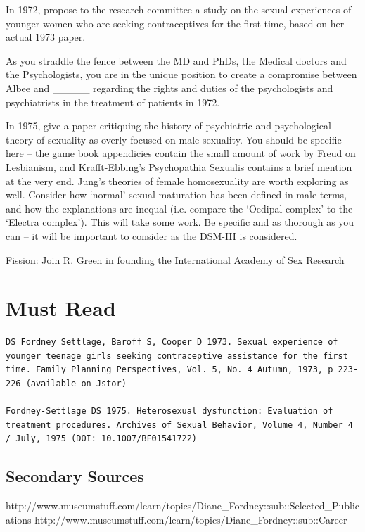 \begin{refsection}
In 1972, propose to the research committee a study on the sexual experiences of younger women who are seeking contraceptives for the first time, based on her actual 1973 paper. 

As you straddle the fence between the MD and PhDs, the Medical doctors and the Psychologists, you are in the unique position to create a compromise between Albee and \_\_\_\_\_ regarding the rights and duties of the psychologists and psychiatrists in the treatment of patients in 1972.

In 1975, give a paper critiquing the history of psychiatric and psychological theory of sexuality as overly focused on male sexuality. You should be specific here – the game book appendicies contain the small amount of work by Freud on Lesbianism, and Krafft-Ebbing's Psychopathia Sexualis contains a brief mention at the very end. Jung's theories of female homosexuality are worth exploring as well. Consider how `normal' sexual maturation has been defined in male terms, and how the explanations are inequal (i.e. compare the `Oedipal complex' to the `Electra complex'). This will take some work. Be specific and as thorough as you can – it will be important to consider as the DSM-III is considered.

Fission: Join R. Green in founding the International Academy of Sex Research

\section{Must Read}
\label{mustread}

\begin{verbatim}
DS Fordney Settlage, Baroff S, Cooper D 1973. Sexual experience of younger teenage girls seeking contraceptive assistance for the first time. Family Planning Perspectives, Vol. 5, No. 4 Autumn, 1973, p 223-226 (available on Jstor)

Fordney-Settlage DS 1975. Heterosexual dysfunction: Evaluation of treatment procedures. Archives of Sexual Behavior, Volume 4, Number 4 / July, 1975 (DOI: 10.1007/BF01541722)
\end{verbatim}

\subsection{Secondary Sources}
\label{secondarysources}

http:\slash \slash www.museumstuff.com\slash learn\slash topics\slash Diane\_Fordney::sub::Selected\_Publications
http:\slash \slash www.museumstuff.com\slash learn\slash topics\slash Diane\_Fordney::sub::Career


\end{refsection}
